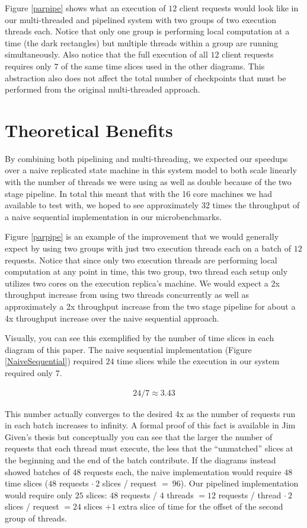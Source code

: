 \documentclass[11pt, oneside]{report}
\begin{document}
Figure \ref{parpipe} shows what an execution of $12$ client requests would look like in our multi-threaded and pipelined system with two groups of two execution threads each. 
Notice that only one group is performing local computation at a time (the dark rectangles) but multiple threads within a group are running simultaneously.
Also notice that the full execution of all $12$ client requests requires only $7$ of the same time slices used in the other diagrams.
This abstraction also does not affect the total number of checkpoints that must be performed from the original multi-threaded approach.

\section{Theoretical Benefits}

By combining both pipelining and multi-threading, we expected our speedups over a naive replicated state machine in this system model to both scale linearly with the number of threads we were using as well as double because of the two stage pipeline. 
In total this meant that with the 16 core machines we had available to test with, we hoped to see approximately 32 times the throughput of a naive sequential implementation in our microbenchmarks. 

Figure \ref{parpipe} is an example of the improvement that we would generally expect by using two groups with just two execution threads each on a batch of $12$ requests.
Notice that since only two execution threads are performing local computation at any point in time, this two group, two thread each setup only utilizes two cores on the execution replica's machine.
We would expect a 2x throughput increase from using two threads concurrently as well as approximately a 2x throughput increase from the two stage pipeline for about a 4x throughput increase over the naive sequential approach.

Visually, you can see this exemplified by the number of time slices in each diagram of this paper.
The naive sequential implementation (Figure \ref{NaiveSequential}) required $24$ time slices while the execution in our system required only $7$.

\begin{align*}
24 / 7 \approx 3.43
\end{align*}

This number actually converges to the desired 4x as the number of requests run in each batch increases to infinity.
A formal proof of this fact is available in Jim Given's thesis but conceptually you can see that the larger the number of requests that each thread must execute, the less that the ``unmatched'' slices at the beginning and the end of the batch contribute. 
If the diagrams instead showed batches of $48$ requests each, the naive implementation would require $48$ time slices ($48$ requests $\cdot \ 2$ slices / request $=\ 96$).
Our pipelined implementation would require only $25$ slices: $48$ requests / $4$ threads $ = 12$ requests / thread $\cdot \ 2$ slices / request $ = 24$ slices $ + 1$ extra slice of time for the offset of the second group of threads. 
\end{document}
